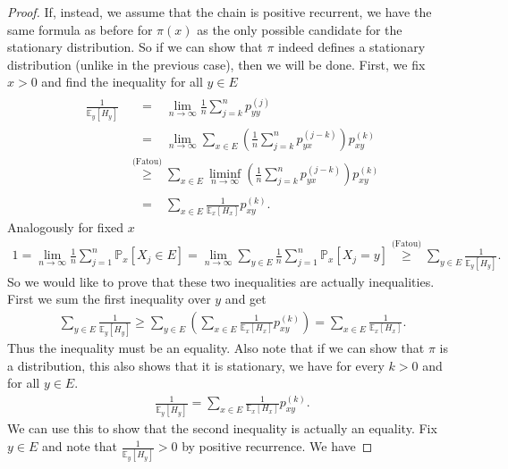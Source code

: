 \begin{proof}
	If, instead, we assume that the chain is positive recurrent, we have the same formula as before for $\pi (x)$ as the only possible candidate for the stationary distribution. So if we can show that $\pi $ indeed defines a stationary distribution (unlike in the previous case), then we will be done. First, we fix $x> 0$ and find the inequality for all $y \in E$ 
\begin{align}
\frac{1}{\mathbb{E}_{y} \left[ H_y \right] } &\stackrel{\phantom{\textrm{(Fatou)}}}{=} \lim_{n\to \infty} \frac{1}{n} \sum_{j=k}^{n} p_{yy}^{(j)} \\
					     &\stackrel{\phantom{\textrm{(Fatou)}}}{=}  \lim_{n \to \infty} \sum_{x \in E}^{} \left( \frac{1}{n} \sum_{j=k}^{n} p_{yx}^{(j-k)} \right) p_{xy}^{(k)} \\
					     &\stackrel{\textrm{(Fatou)}}{\geq} \sum_{x \in E}^{}  \liminf_{n \to \infty } \left( \frac{1}{n} \sum_{j=k}^{n} p_{yx}^{(j-k)} \right) p_{xy}^{(k)} \\
					     &\stackrel{\phantom{\textrm{(Fatou)}}}{=}  \sum_{x \in E}^{} \frac{1}{\mathbb{E}_{x} \left[ H_x \right] } p_{xy}^{(k)}.
\end{align}
Analogously for fixed $x$
\begin{align}
	1 = \lim_{n \to \infty } \frac{1}{n} \sum_{j=1}^{n} \mathbb{P}_{x} \left[ X_j \in E \right] = \lim_{n\to \infty }\sum_{y \in E}^{}  \frac{1}{n} \sum_{j=1}^{n}\mathbb{P}_{x} \left[ X_j = y \right] \stackrel{\textrm{(Fatou)}}{\geq} \sum_{y \in E}^{} \frac{1}{\mathbb{E}_{y} \left[ H_y \right] }
.\end{align}
So we would like to prove that these two inequalities are actually inequalities. First we sum the first inequality over $y$ and get
\begin{align}
	\sum_{y \in E}^{} \frac{1}{\mathbb{E}_{y} \left[ H_y \right] } \geq \sum_{y \in E}^{} \left( \sum_{x \in E}^{} \frac{1}{\mathbb{E}_{x} \left[ H_x \right] } p_{xy}^{(k)} \right) = \sum_{x \in E}^{} \frac{1}{\mathbb{E}_{x} \left[ H_x \right] }
.\end{align}
Thus the inequality must be an equality. {\color{blue}Also note that if we can show that $\pi$ is a distribution, this also shows that it is stationary,} we have for every $k> 0$ and for all $y \in E$. 
\begin{align}
\frac{1}{\mathbb{E}_{y} \left[ H_y \right] } = \sum_{x \in E}^{} \frac{1}{\mathbb{E}_{x} \left[ H_x \right] } p_{xy}^{(k)}.	
\end{align}
We can use this to show that the second inequality is actually an equality. Fix $y \in E$ and note that $\frac{1}{\mathbb{E}_{y} \left[ H_y \right] }>0$ by positive recurrence. We have

\end{proof}
